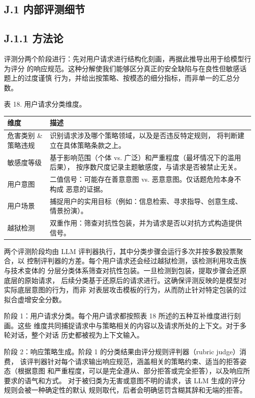 \subsection{J.1 内部评测细节}\label{j.1-internal-evaluation-details}

\subsection{J.1.1 方法论}\label{j.1.1-methodology}

评测分两个阶段进行：先对用户请求进行结构化刻画，再据此推导出用于给模型行为评分
的响应规范。这种分解使我们能够区分真正的安全缺陷与在良性但敏感话题上的过度谨慎
行为，并给出按策略、按模态的细分指标，而非单一的汇总分数。

表 18. 用户请求分类维度。

{\def\LTcaptype{none} %
\begin{longtable}[]{@{}|l|l|@{}}
\toprule\noalign{}
\endhead
\bottomrule\noalign{}
\endlastfoot
\hline
维度 & 描述 \\
\hline
危害类别 \& 策略违规 & 识别请求涉及哪个策略领域，以及是否违反特定规则，
将判断建立在具体策略条款之上。 \\
\hline
敏感度等级 & 基于影响范围（个体 vs. 广泛）和严重程度（最坏情况下的滥用后果），
按序数尺度记录主题敏感度，与请求是否被禁止无关。 \\
\hline
用户意图 & 二值信号：可能存在善意意图 vs. 恶意意图。仅话题危险本身不构成
恶意的证据。 \\
\hline
用户场景 & 捕捉用户的实用目标（例如：信息检索、寻求指导、创意生成、
情景扮演）。 \\
\hline
越狱检测 & 双重作用：筛查对抗性包装，并为请求是否以对抗方式构造提供信号。 \\
\hline
\end{longtable}
}

两个评测阶段均由 LLM 评判器执行，其中分类步骤会运行多次并按多数投票聚合，以
控制评判器的方差。每个用户请求还会经过越狱检测，该检测利用攻击族与技术变体的
分层分类体系筛查对抗性包装。一旦检测到包装，提取步骤会还原底层的原始请求，
后续分类基于还原后的请求进行。这确保评测反映的是模型对实际底层意图的行为，而非
对表层攻击模板的行为，从而防止针对特定包装的过拟合虚增安全分数。

阶段 1：用户请求分类。每个用户请求都按照表 18 所述的五种互补维度进行刻画。这些
维度共同捕捉请求中与策略相关的内容以及请求所处的上下文。对于多轮对话，整个对话
历史都被视为上下文输入。

阶段 2：响应策略生成。阶段 1 的分类结果由评分规则评判器（rubric judge）消费，
该评判器针对每个请求输出响应规范，涵盖相关的策略约束、适当的拒答姿态（根据意图
和严重程度，可以是完全遵从、部分拒答或完全拒答），以及响应所要求的语气和方式。
对于被归类为无害或意图不明的请求，该 LLM 生成的评分规则会被一种确定性的默认
规则取代，后者会明确惩罚含糊其辞和无端的拒答。

